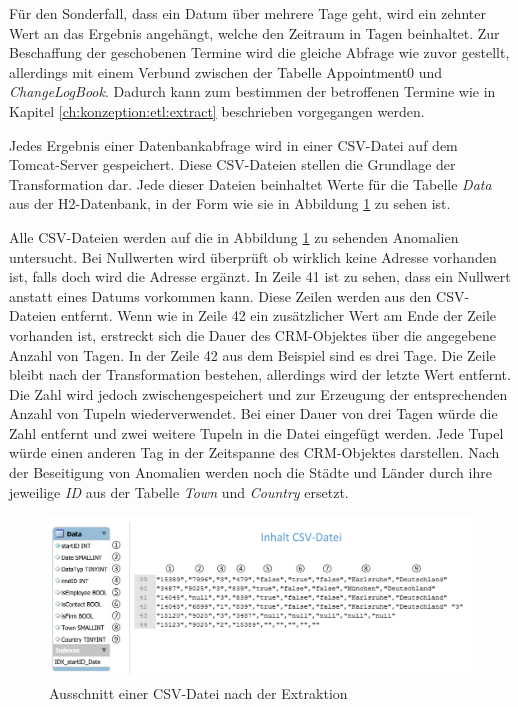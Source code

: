 Für den Sonderfall, dass ein Datum über mehrere Tage geht, wird ein zehnter Wert an das Ergebnis angehängt, welche den Zeitraum in Tagen beinhaltet. Zur Beschaffung der geschobenen Termine wird die gleiche Abfrage wie zuvor gestellt, allerdings mit einem Verbund zwischen der Tabelle Appointment0 und \textit{ChangeLogBook}. Dadurch kann zum bestimmen der betroffenen Termine wie in Kapitel \ref{ch:konzeption:etl:extract} beschrieben vorgegangen werden.

Jedes Ergebnis einer Datenbankabfrage wird in einer CSV-Datei auf dem Tomcat-Server gespeichert. Diese CSV-Dateien stellen die Grundlage der Transformation dar. Jede dieser Dateien beinhaltet Werte für die Tabelle \textit{Data} aus der H2-Datenbank, in der Form wie sie in Abbildung \ref{fig:umsetzung_csv_datei} zu sehen ist. 

Alle CSV-Dateien werden auf die in Abbildung \ref{fig:umsetzung_csv_datei} zu sehenden Anomalien untersucht. Bei Nullwerten wird überprüft ob wirklich keine Adresse vorhanden ist, falls doch wird die Adresse ergänzt. In Zeile 41 ist zu sehen, dass ein Nullwert anstatt eines Datums vorkommen kann. Diese Zeilen werden aus den CSV-Dateien entfernt. Wenn wie in Zeile 42 ein zusätzlicher Wert am Ende der Zeile vorhanden ist, erstreckt sich die Dauer des CRM-Objektes über die angegebene Anzahl von Tagen. In der Zeile 42 aus dem Beispiel sind es drei Tage. Die Zeile bleibt nach der Transformation bestehen, allerdings wird der letzte Wert entfernt. Die Zahl wird jedoch zwischengespeichert und zur Erzeugung der entsprechenden Anzahl von Tupeln wiederverwendet. Bei einer Dauer von drei Tagen würde die Zahl entfernt und zwei weitere Tupeln in die Datei eingefügt werden. Jede Tupel würde einen anderen Tag in der Zeitspanne des CRM-Objektes darstellen. Nach der Beseitigung von Anomalien werden noch die Städte und Länder durch ihre jeweilige \textit{ID} aus der Tabelle \textit{Town} und \textit{Country} ersetzt.

\begin{figure}[htbp]
\begin{center}
\includegraphics[width=1.0\textwidth]{pics/umsetzung_transformation.pdf}
\caption{Ausschnitt einer CSV-Datei nach der Extraktion}
\label{fig:umsetzung_csv_datei}
\end{center}
\end{figure}


